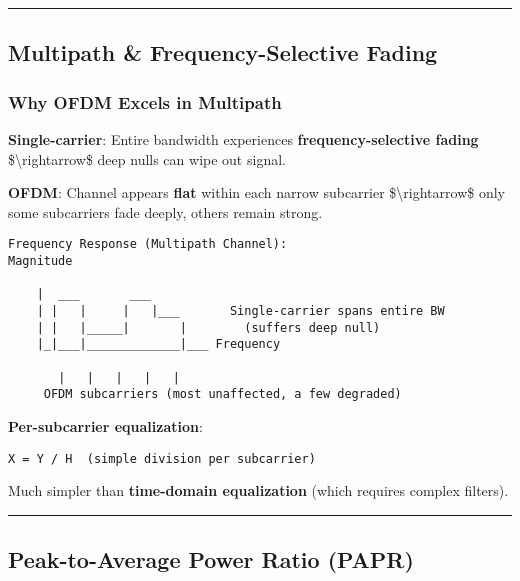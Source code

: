 \begin{center}\rule{0.5\linewidth}{0.5pt}\end{center}

\subsection{\texorpdfstring{ Multipath \& Frequency-Selective
Fading}{ Multipath \& Frequency-Selective Fading}}\label{multipath-frequency-selective-fading}

\subsubsection{Why OFDM Excels in
Multipath}\label{why-ofdm-excels-in-multipath}

\textbf{Single-carrier}: Entire bandwidth experiences
\textbf{frequency-selective fading} \$\textbackslash rightarrow\$ deep
nulls can wipe out signal.

\textbf{OFDM}: Channel appears \textbf{flat} within each narrow
subcarrier \$\textbackslash rightarrow\$ only some subcarriers fade
deeply, others remain strong.

\begin{verbatim}
Frequency Response (Multipath Channel):
Magnitude
    
    |  ___       ___
    | |   |     |   |___       Single-carrier spans entire BW
    | |   |_____|       |        (suffers deep null)
    |_|___|_____________|___ Frequency
                   
       |   |   |   |   |
     OFDM subcarriers (most unaffected, a few degraded)
\end{verbatim}

\textbf{Per-subcarrier equalization}:

\begin{verbatim}
X = Y / H  (simple division per subcarrier)
\end{verbatim}

Much simpler than \textbf{time-domain equalization} (which requires
complex filters).

\begin{center}\rule{0.5\linewidth}{0.5pt}\end{center}

\subsection{\texorpdfstring{ Peak-to-Average Power Ratio
(PAPR)}{ Peak-to-Average Power Ratio (PAPR)}}\label{peak-to-average-power-ratio-papr}

